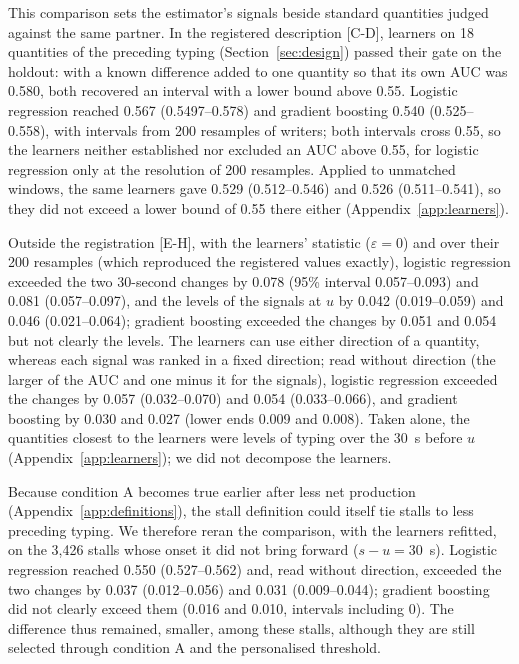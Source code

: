 This comparison sets the estimator's signals beside standard quantities judged against the same partner. In the
registered description [C-D], learners on 18 quantities of the preceding typing (Section~\ref{sec:design}) passed their
gate on the holdout: with a known difference added to one quantity so that its own AUC was 0.580, both recovered an
interval with a lower bound above 0.55. Logistic regression reached 0.567 (0.5497--0.578) and gradient boosting 0.540
(0.525--0.558), with intervals from 200 resamples of writers; both intervals cross 0.55, so the learners neither
established nor excluded an AUC above 0.55, for logistic regression only at the resolution of 200 resamples. Applied to
unmatched windows, the same learners gave 0.529 (0.512--0.546) and 0.526 (0.511--0.541), so they did not exceed a lower
bound of 0.55 there either (Appendix~\ref{app:learners}).

Outside the registration [E-H], with the learners' statistic ($\varepsilon = 0$) and over their 200 resamples (which
reproduced the registered values exactly), logistic regression exceeded the two 30-second changes by 0.078 (95\% interval
0.057--0.093) and 0.081 (0.057--0.097), and the levels of the signals at $u$ by 0.042 (0.019--0.059) and 0.046
(0.021--0.064); gradient boosting exceeded the changes by 0.051 and 0.054 but not clearly the levels. The learners can
use either direction of a quantity, whereas each signal was ranked in a fixed direction; read without direction (the
larger of the AUC and one minus it for the signals), logistic regression exceeded the changes by 0.057 (0.032--0.070)
and 0.054 (0.033--0.066), and gradient boosting by 0.030 and 0.027 (lower ends 0.009 and 0.008). Taken alone, the
quantities closest to the learners were levels of typing over the 30~s before $u$ (Appendix~\ref{app:learners}); we did
not decompose the learners.

Because condition A becomes true earlier after less net production (Appendix~\ref{app:definitions}), the stall
definition could itself tie stalls to less preceding typing. We therefore reran the comparison, with the learners
refitted, on the 3,426 stalls whose onset it did not bring forward ($s - u = 30$~s). Logistic regression reached 0.550
(0.527--0.562) and, read without direction, exceeded the two changes by 0.037 (0.012--0.056) and 0.031 (0.009--0.044);
gradient boosting did not clearly exceed them (0.016 and 0.010, intervals including 0). The difference thus remained,
smaller, among these stalls, although they are still selected through condition A and the personalised threshold.

